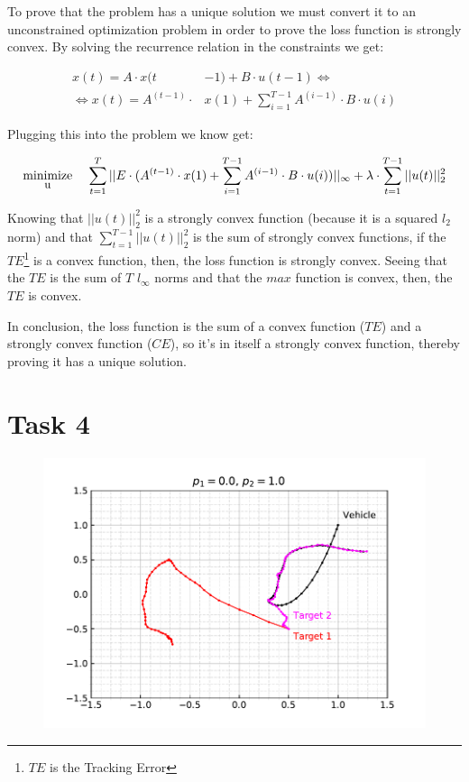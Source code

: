 \documentclass[12pt]{article}
\begin{document}
\par
To prove that the problem has a unique solution we must convert it to an unconstrained optimization problem in order to prove the loss function is strongly convex. By solving the recurrence relation in the constraints we get:

\begin{align*}
    x(t)= A \cdot x(t&-1) + B \cdot u(t-1)
    \Leftrightarrow
    \\
    \Leftrightarrow 
    x(t)= A^{(t-1)} \cdot & x(1) + \sum_{i=1}^{T-1} A^{(i-1)} \cdot B \cdot u(i)
\end{align*}

\par
Plugging this into the problem we know get:

\begin{align*}
    \stackunder{minimize}{\small{u}} \hspace{0.4cm}
    \sum_{t=1}^{T} ||E \cdot (A^{(t-1)} \cdot x(1) + \sum_{i=1}^{T-1} A^{(i-1)} \cdot B \cdot u(i))||_{\infty} +
    \lambda \cdot \sum_{t=1}^{T-1} ||u(t)||_{2}^2
\end{align*}

\par
Knowing that  $||u(t)||_{2}^2$ is a strongly convex function (because it is a squared $\mathit{l_2}$ norm) and that $\sum_{t=1}^{T-1} ||u(t)||_{2}^2$ is the sum of strongly convex functions, if the $TE$\footnote{$TE$ is the Tracking Error} is a convex function, then, the loss function is strongly convex. Seeing that the $TE$ is the sum of $T$ $\mathit{l_\infty}$ norms and that the $max$ function is convex, then, the $TE$ is convex.

\par
In conclusion, the loss function is the sum of a convex function ($TE$) and a strongly convex function ($CE$), so it's in itself a strongly convex function, thereby proving it has a unique solution.

\section{Task 4}

\begin{figure}[H]
    \centering
    \includegraphics{../../src/task_4/output/ex_4_i=1.pdf}
\end{figure}
\end{document}
